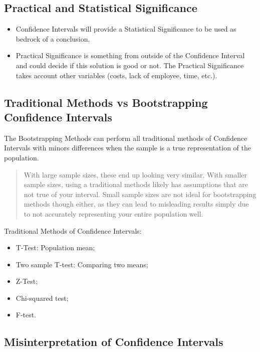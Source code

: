 \documentclass[]{book}
\providecommand{\tightlist}{%
  \setlength{\itemsep}{0pt}\setlength{\parskip}{0pt}}
\begin{document}
\subsection{Practical and Statistical
Significance}\label{practical-and-statistical-significance}

\begin{itemize}
\tightlist
\item
  Confidence Intervals will provide a Statistical Significance to be
  used as bedrock of a conclusion.
\item
  Practical Significance is something from outside of the Confidence
  Interval and could decide if this solution is good or not. The
  Practical Significance takes account other variables (costs, lack of
  employee, time, etc.).
\end{itemize}

\subsection{Traditional Methods vs Bootstrapping Confidence
Intervals}\label{traditional-methods-vs-bootstrapping-confidence-intervals}

The Bootstrapping Methods can perform all traditional methods of
Confidence Intervals with minors differences when the sample is a true
representation of the population.

\begin{quote}
With large sample sizes, these end up looking very similar. With smaller
sample sizes, using a traditional methods likely has assumptions that
are not true of your interval. Small sample sizes are not ideal for
bootstrapping methods though either, as they can lead to misleading
results simply due to not accurately representing your entire population
well.
\end{quote}

Traditional Methods of Confidence Intervals:

\begin{itemize}
\tightlist
\item
  T-Test: Population mean;
\item
  Two sample T-test: Comparing two means;
\item
  Z-Test;
\item
  Chi-squared test;
\item
  F-test.
\end{itemize}

\subsection{Misinterpretation of Confidence
Intervals}\label{misinterpretation-of-confidence-intervals}
\end{document}
